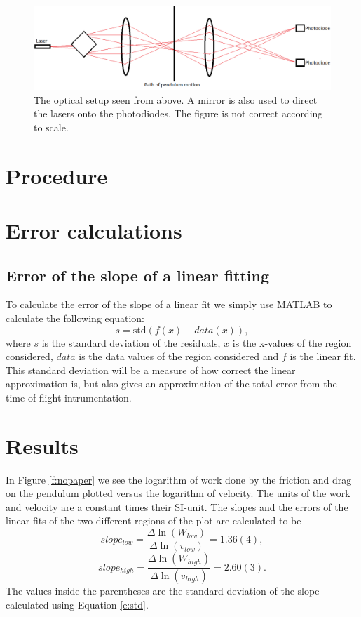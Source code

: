 ﻿\documentclass[11pt, a4paper]{article}
\begin{document}
\begin{figure}[h]
	\centering
	\includegraphics[scale=0.4]{opticalsetup2}
	\caption{The optical setup seen from above. A mirror is also used to direct the 
  lasers onto the photodiodes. The figure is not correct according to scale.}
	\label{f:opticalsetup}
\end{figure}

\section{Procedure}

\section{Error calculations}

\subsection{Error of the slope of a linear fitting}
To calculate the error of the slope of a linear fit we simply use MATLAB to 
calculate the following equation:
\begin{equation}
	s = \text{std}(f(x)-data(x)),
	\label{e:std}
\end{equation}
where $s$ is the standard deviation of the residuals, $x$ is the x-values of the 
region considered, 
$data$ is the data values of the region considered and $f$ is the linear fit.
This standard deviation will be a measure of how correct the linear approximation is, 
but also gives an approximation of the total error from the time of flight 
intrumentation.

\section{Results}
In Figure \ref{f:nopaper} we see the logarithm of work done by the friction and 
drag on the pendulum plotted versus the logarithm of velocity. 
The units of the work and velocity are a constant times their SI-unit. 
The slopes and the errors of the linear fits of the two different regions of the 
plot are calculated to be
\[
	slope_{low}=\frac{\Delta\ln(W_{low})}{\Delta\ln(v_{low})} = 1.36(4),
\]\[
	slope_{high}=\frac{\Delta\ln(W_{high})}{\Delta\ln(v_{high})} = 2.60(3).
\]
The values inside the parentheses are the standard deviation of the slope 
calculated using Equation \ref{e:std}.
\end{document}

